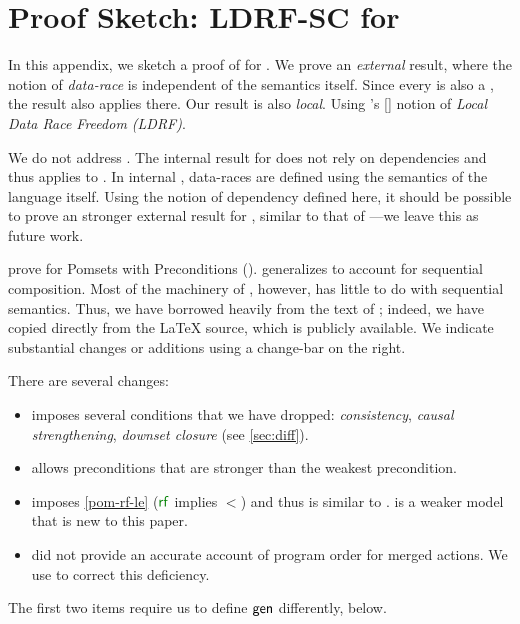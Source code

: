 \section{Proof Sketch: LDRF-SC for \PwTmcaTITLE{}}
\label{sec:sc}


\begin{changed}
  In this appendix, we sketch a proof of \drfsc{} for .  We prove an
  \emph{external} result, where the notion of \emph{data-race} is independent
  of the semantics itself.  Since every  is also a , the
  result also applies there.  Our result is also \emph{local}.  Using
  \citeauthor{Dolan:2018:BDR:3192366.3192421}'s
  [\citeyear{Dolan:2018:BDR:3192366.3192421}] notion of \emph{Local Data Race
    Freedom (LDRF)}.

  We do not address \PwTc{}.  The internal \drfsc{} result for \cXI{}
  \cite{DBLP:phd/ethos/Batty15} does not rely on dependencies and thus
  applies to \PwTc{}.  In internal \drfsc{}, data-races are defined using the
  semantics of the language itself.  Using the notion of dependency defined
  here, it should be possible to prove an stronger external result for
  \cXI{}, similar to that of \cite{DBLP:conf/pldi/LahavVKHD17}---we leave
  this as future work.

  \citet{DBLP:journals/pacmpl/JagadeesanJR20} prove \ldrfsc{} for Pomsets
  with Preconditions (\PwP{}).  \PwTmca{} generalizes \PwP{} to account for
  sequential composition.  Most of the machinery of \ldrfsc{}, however, has
  little to do with sequential semantics.  Thus, we have borrowed heavily
  from the text of \cite{DBLP:journals/pacmpl/JagadeesanJR20}; indeed, we
  have copied directly from the \LaTeX{} source, which is publicly available.
  We indicate substantial changes or additions using a change-bar on the
  right.

  There are several changes:
  \begin{itemize}
  \item \PwP{} imposes several conditions that we have dropped:
    \emph{consistency}, \emph{causal strengthening}, \emph{downset closure}
    (see \textsection\ref{sec:diff}).
  \item \PwP{} allows preconditions that are stronger than the weakest precondition.
  \item \PwP{} imposes \ref{pom-rf-le} ($\rrfx$ implies $\lt$) and thus is
    similar to .   is a weaker model that is new to this
    paper.  %
  \item \PwP{} did not provide an accurate account of program order for
    merged actions.  We use  to correct this deficiency.
  \end{itemize}
  The first two items require us to define $\semmin{}$ differently, below.
\end{changed}

